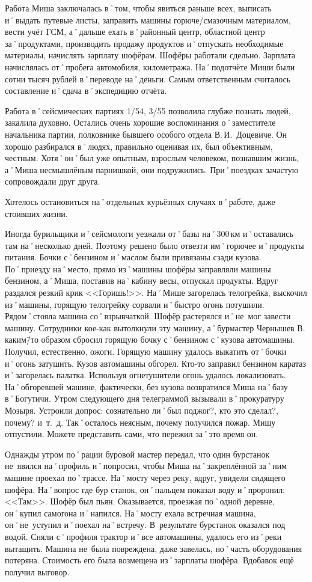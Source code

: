 Работа Миша заключалась в˚том, чтобы явиться раньше всех, выписать и˚выдать путевые листы, заправить машины горюче\-/смазочным материалом, вести учёт ГСМ, а˚дальше ехать в˚районный центр, областной центр за˚продуктами, производить продажу продуктов и˚отпускать необходимые материалы, начислять зарплату шофёрам. Шофёры работали сдельно. Зарплата начислялась от˚пробега автомобиля, километража. На˚подотчёте Миши были сотни тысяч рублей в˚переводе на˚деньги. Самым ответственным считалось составление и˚сдача в˚экспедицию отчёта.

Работа в˚сейсмических партиях 1/54, 3/55 позволила глубже познать людей, закалила духовно. Остались очень хорошие воспоминания о˚заместителе начальника партии, полковнике бывшего особого отдела В.\,И.~Доцевиче. Он хорошо разбирался в˚людях, правильно оценивая их, был объективным, честным. Хотя˚он˚был уже опытным, взрослым человеком, познавшим жизнь, а˚Миша несмышлёным парнишкой, они подружились. При˚поездках зачастую сопровождали друг друга.

Хотелось остановиться на˚отдельных курьёзных случаях в˚работе, даже стоивших жизни. 

Иногда бурильщики и˚сейсмологи уезжали от˚базы на˚300\,км и˚оставались там на˚несколько дней. Поэтому решено было отвезти им˚горючее и˚продукты питания. Бочки с˚бензином и˚маслом были привязаны сзади кузова. По˚приезду на˚место, прямо из˚машины шофёры заправляли машины бензином, а˚Миша, поставив на˚кабину весы, отпускал продукты. Вдруг раздался резкий крик <<Горишь!>>. На˚Мише загорелась телогрейка, выскочил из˚машины, горящую телогрейку сорвали и˚быстро огонь потушили. Рядом˚стояла машина со˚взрывчаткой. Шофёр растерялся и˚не~мог завести машину. Сотрудники кое-как вытолкнули эту машину, а˚бурмастер Чернышев В. каким\=/то образом сбросил горящую бочку с˚бензином с˚кузова автомашины. Получил, естественно, ожоги. Горящую машину удалось выкатить от˚бочки и˚огонь затушить. Кузов автомашины обгорел. Кто-то заправил бензином каратаз и˚загорелась палатка. Используя огнетушители огонь удалось локализовать. На˚обгоревшей машине, фактически, без кузова возвратился Миша на˚базу в˚Богутичи. Утром следующего дня телеграммой вызывали в˚прокуратуру Мозыря. Устроили допрос: сознательно ли˚был поджог?, кто это сделал?, почему? и~т.~д. Так˚осталось неясным, почему получился пожар. Мишу отпустили. Можете представить сами, что пережил за˚это время он.

Однажды утром по˚рации буровой мастер передал, что один бурстанок не~явился на˚профиль и˚попросил, чтобы Миша на˚закреплённой за˚ним машине проехал по˚трассе. На˚мосту через реку, вдруг, увидели сидящего шофёра. На˚вопрос где бур станок, он˚пальцем показал воду и˚проронил: <<Там>>. Шофёр был пьян. Оказывается, проезжая по˚одной деревне, он˚купил самогона и˚напился. На˚мосту ехала встречная машина, он˚не~уступил и˚поехал на˚встречу. В~результате бурстанок оказался под водой. Сняли с˚профиля трактор и˚все автомашины, удалось его из˚реки вытащить. Машина не~была повреждена, даже завелась, но˚часть оборудования потеряна. Стоимость его была возмещена из˚зарплаты шофёра. Вдобавок ещё получил выговор. 

